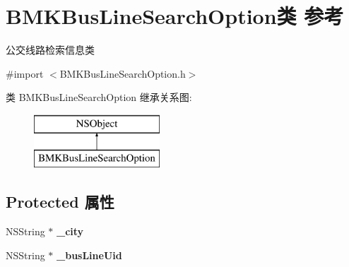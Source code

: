 \hypertarget{interface_b_m_k_bus_line_search_option}{\section{B\+M\+K\+Bus\+Line\+Search\+Option类 参考}
\label{interface_b_m_k_bus_line_search_option}
}


公交线路检索信息类  




{\ttfamily \#import $<$B\+M\+K\+Bus\+Line\+Search\+Option.\+h$>$}

类 B\+M\+K\+Bus\+Line\+Search\+Option 继承关系图\+:\begin{figure}[H]
\begin{center}
\leavevmode
\includegraphics[height=2.000000cm]{interface_b_m_k_bus_line_search_option}
\end{center}
\end{figure}
\subsection*{Protected 属性}
\begin{DoxyCompactItemize}
\item 
\hypertarget{interface_b_m_k_bus_line_search_option_a7a4d92693254a3f0d2c1e79b3a5eb88b}{N\+S\+String $\ast$ {\bfseries \+\_\+city}}\label{interface_b_m_k_bus_line_search_option_a7a4d92693254a3f0d2c1e79b3a5eb88b}

\item 
\hypertarget{interface_b_m_k_bus_line_search_option_a382c85171a018c5487143fd560068c39}{N\+S\+String $\ast$ {\bfseries \+\_\+bus\+Line\+Uid}}\label{interface_b_m_k_bus_line_search_option_a382c85171a018c5487143fd560068c39}

\end{DoxyCompactItemize}
